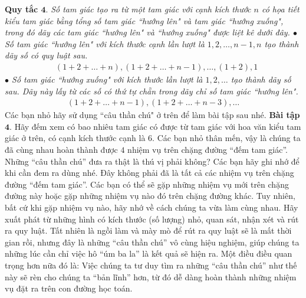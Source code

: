 \vskip 0.1cm
{\bf\color{toancuabi} Quy tắc $\pmb{4.}$} \textit{Số tam giác tạo ra từ một tam giác với cạnh kích thước $n$ có họa tiết kiểu tam giác bằng tổng số tam giác ``hướng lên" và tam giác ``hướng xuống", trong đó dãy các tam giác ``hướng lên" và ``hướng xuống" được liệt kê dưới đây.
	\vskip 0.1cm
	$\bullet$ Số tam giác ``hướng lên" với kích thước cạnh lần lượt là $1, 2,\ldots, n-1, n$ tạo thành dãy số có quy luật sau.
	\begin{align*}
		&(1\!+\!2\!+\!\ldots\!+\!n), (1\!+\!2\!+\!\ldots\!+\! n\!-\!1), \ldots,(1\!+\!2), 1 
	\end{align*}
	$\bullet$ Số tam giác ``hướng xuống" với kích thước lần lượt là $1, 2,\ldots$ tạo thành dãy số sau. Dãy này lấy từ các số có thứ tự chẵn trong dãy chỉ số tam giác ``hướng lên".}
\begin{align*}
	(1 \!+\! 2 \!+\! \ldots \!+\! n\!-\!1), (1 \!+\! 2 \!+\! \ldots \!+\! n\!-\!3),\ldots
\end{align*}
Các bạn nhỏ hãy sử dụng ``câu thần chú" ở trên để làm bài tập sau nhé. 
\vskip 0.1cm
{\bf\color{toancuabi} Bài tập $\pmb{4.}$} Hãy đếm xem có bao nhiêu tam giác có được từ tam giác với hoa văn kiểu tam giác ở trên, có cạnh kích thước cạnh là $6$.
\vskip 0.1cm
Các bạn nhỏ thân mến, vậy là chúng ta đã cùng nhau hoàn thành được $4$ nhiệm vụ trên chặng đường “đếm tam giác”. Những “câu thần chú” đưa ra thật là thú vị phải không? Các bạn hãy ghi nhớ để khi cần đem ra dùng nhé. Đây không phải đã là tất cả các nhiệm vụ trên chặng đường “đếm tam giác”. Các bạn có thể sẽ gặp những nhiệm vụ mới trên chặng đường này hoặc gặp những nhiệm vụ nào đó trên chặng đường khác. Tuy nhiên, bất cứ khi gặp nhiệm vụ nào, hãy nhớ về cách chúng ta vừa làm cùng nhau. Hãy xuất phát từ những hình có kích thước (số lượng) nhỏ, quan sát, nhận xét và rút ra quy luật. Tất nhiên là ngồi làm và mày mò để rút ra quy luật sẽ là mất thời gian rồi, nhưng đây là những “câu thần chú” vô cùng hiệu nghiệm, giúp chúng ta những lúc cần chỉ việc hô “úm ba la” là kết quả sẽ hiện ra. Một điều điều quan trọng hơn nữa đó là: Việc chúng ta tư duy tìm ra những “câu thần chú” như thế này sẽ rèn cho chúng ta “bản lĩnh” hơn, từ đó dễ dàng hoàn thành những nhiệm vụ đặt ra trên con đường học toán.